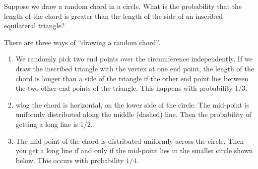 \documentclass[a4paper]{article}
\begin{document}
\begin{eg}
  Suppose we draw a random chord in a circle. What is the probability that the length of the chord is greater than the length of the side of an inscribed equilateral triangle?

  There are three ways of ``drawing a random chord''.
  \begin{enumerate}
    \item We randomly pick two end points over the circumference independently. If we draw the inscribed triangle with the vertex at one end point, the length of the chord is longer than a side of the triangle if the other end point lies between the two other end points of the triangle. This happens with probability $1/3$.
      \begin{center}
      \end{center}
    \item wlog the chord is horizontal, on the lower side of the circle. The mid-point is uniformly distributed along the middle (dashed) line. Then the probability of getting a long line is $1/2$.
      \begin{center}
      \end{center}
    \item The mid point of the chord is distributed uniformly across the circle. Then you get a long line if and only if the mid-point lies in the smaller circle shown below. This occurs with probability $1/4$.
       \begin{center}
      \end{center}
  \end{enumerate}
\end{eg}
\end{document}
